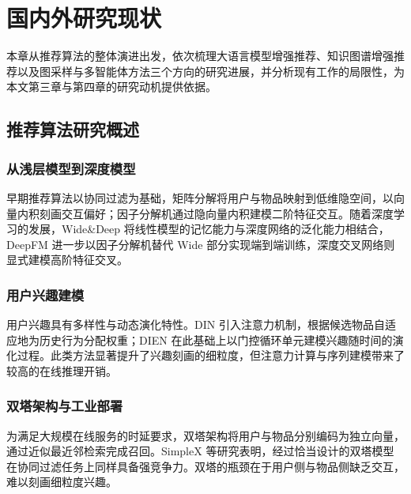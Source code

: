 
\chapter{国内外研究现状}
\label{cha:related-work}

本章从推荐算法的整体演进出发，依次梳理大语言模型增强推荐、知识图谱增强推荐以及图采样与多智能体方法三个方向的研究进展，并分析现有工作的局限性，为本文第三章与第四章的研究动机提供依据。

\section{推荐算法研究概述}
\label{sec:rec-overview}

\subsection{从浅层模型到深度模型}
\label{subsec:shallow-to-deep}

早期推荐算法以协同过滤为基础，矩阵分解将用户与物品映射到低维隐空间，以向量内积刻画交互偏好\cite{koren2009mf}；因子分解机通过隐向量内积建模二阶特征交互\cite{rendle2010fm}。随着深度学习的发展，Wide\&Deep 将线性模型的记忆能力与深度网络的泛化能力相结合\cite{cheng2016wide}，DeepFM 进一步以因子分解机替代 Wide 部分实现端到端训练\cite{guo2017deepfm}，深度交叉网络则显式建模高阶特征交叉\cite{wang2017dcn}。

\subsection{用户兴趣建模}
\label{subsec:interest-modeling}

用户兴趣具有多样性与动态演化特性。DIN 引入注意力机制，根据候选物品自适应地为历史行为分配权重\cite{zhou2018din}；DIEN 在此基础上以门控循环单元建模兴趣随时间的演化过程\cite{zhou2019dien}。此类方法显著提升了兴趣刻画的细粒度，但注意力计算与序列建模带来了较高的在线推理开销。

\subsection{双塔架构与工业部署}
\label{subsec:two-tower}

为满足大规模在线服务的时延要求，双塔架构将用户与物品分别编码为独立向量，通过近似最近邻检索完成召回\cite{huang2013dssm}。SimpleX 等研究表明，经过恰当设计的双塔模型在协同过滤任务上同样具备强竞争力\cite{mao2021simplex}。双塔的瓶颈在于用户侧与物品侧缺乏交互，难以刻画细粒度兴趣。

